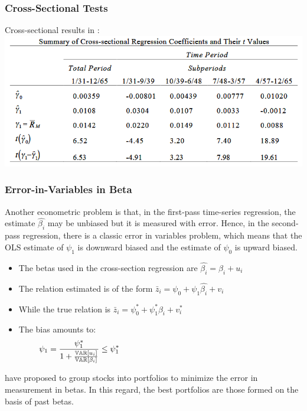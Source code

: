 \documentclass[xcolor=dvipsnames, english, 8pt]{beamer}
\begin{document}
\begin{frame}
    \frametitle{Cross-Sectional Tests}
\begin{center}
    Cross-sectional results in \cite{Black1972}:\vspace{0.5cm}\\
    \includegraphics[scale=0.5]{BJS1}
\end{center}
\end{frame}

\begin{frame}
    \frametitle{Error-in-Variables in Beta}

Another econometric problem is that, in the first-pass time-series regression, the estimate $\hat{\beta_i}$ may be unbiased but it is measured with error. Hence, in the second-pass regression, there is a classic {\color{ubRed} error in variables problem}, which means that the OLS estimate of $\psi_1$ is downward biased and the estimate of $\psi_0$ is upward biased.  \vspace{0.5cm}\\
\begin{itemize}
    \item The betas used in the cross-section regression are $\hat{\beta_i} = \beta_i + u_i$
    \item The relation estimated is of the form $\bar{z}_i = \psi_0 + \psi_1\hat{\beta_i}+ v_i$
    \item While the true relation is $\bar{z}_i = \psi_0^{*} + \psi_1^{*}\beta_i+ v_i^{*}$
    \item The bias amounts to:
    \begin{align*}
        \psi_1 &=  \frac{\psi_1^{*}}{1 + \frac{\mathbb{VAR}[u_i]}{\mathbb{VAR}[\beta_i]}} \leq \psi_1^{*} \hspace{7cm}\vspace{0.5cm}\\
    \end{align*}
\end{itemize}
\cite{FAMA1973} have proposed to {\color{ubRed}group stocks into portfolios} to minimize the error in measurement in betas. In this regard, the best portfolios are those formed on the basis of past betas.
\end{frame}
\end{document}
